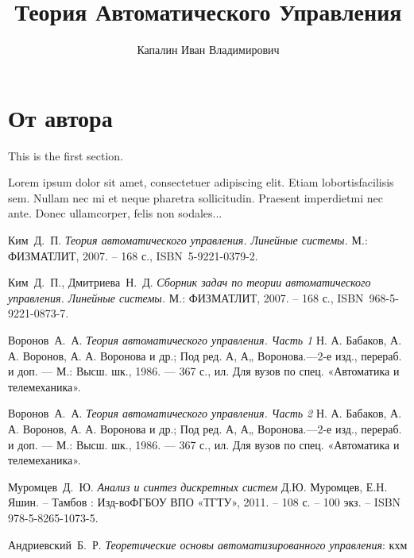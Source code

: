 \documentclass[a4paper,12pt]{extreport}
\title{Теория Автоматического Управления}
\author{Капалин Иван Владимирович}
\date{}
\theoremstyle{plain}
\theoremstyle{definition}
\theoremstyle{remark}
\theoremstyle{plain}
\begin{document}
\maketitle

\tableofcontents

\chapter*{От автора}

    This is the first section.
     
    Lorem  ipsum  dolor  sit  amet,  consectetuer  adipiscing  
    elit.   Etiam  lobortisfacilisis sem.  Nullam nec mi et 
    neque pharetra sollicitudin.  Praesent imperdietmi nec ante. 
    Donec ullamcorper, felis non sodales...







\begin{thebibliography}{0}

     Ким~Д.~П.
    \emph{Теория автоматического управления. Линейные системы.} М.: ФИЗМАТЛИТ, 2007. – 168 с., ISBN~5-9221-0379-2.

     Ким~Д.~П., Дмитриева~Н.~Д.
    \emph{Сборник задач по теории автоматического управления. Линейные системы.} М.: ФИЗМАТЛИТ, 2007. – 168 с., ISBN~968-5-9221-0873-7.

     Воронов~А.~А.
    \emph{Теория автоматического управления. Часть 1} Н. А. Бабаков, А. А. Воронов, А. А. Воронова и др.; Под ред. А, А„ Воронова.—2-е изд., перераб. и доп. — М.: Высш. шк., 1986. — 367 с., ил. Для вузов по спец. «Автоматика и телемеханика».

     Воронов~А.~А.
    \emph{Теория автоматического управления. Часть 2} Н. А. Бабаков, А. А. Воронов, А. А. Воронова и др.; Под ред. А, А„ Воронова.—2-е изд., перераб. и доп. — М.: Высш. шк., 1986. — 367 с., ил. Для вузов по спец. «Автоматика и телемеханика».

     Муромцев~Д.~Ю.
    \emph{Анализ и синтез дискретных систем} Д.Ю. Муромцев, Е.Н. Яшин. – Тамбов : Изд-воФГБОУ ВПО «ТГТУ», 2011. – 108 с. – 100 экз. – ISBN 978-5-8265-1073-5.

     Андриевский~Б.~Р.
    \emph{Теоретические основы автоматизированного управления}: кхм

\end{thebibliography}
\end{document}
